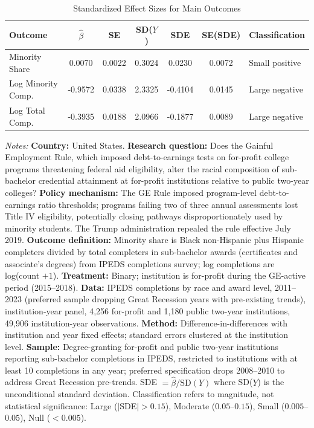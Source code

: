 \begin{table}[H]
\centering
\caption{Standardized Effect Sizes for Main Outcomes}
\label{tab:sde}
\begin{threeparttable}
\begin{tabular}{lcccccl}
\toprule
Outcome & $\hat{\beta}$ & SE & SD($Y$) & SDE & SE(SDE) & Classification \\
\midrule
Minority Share & 0.0070 & 0.0022 & 0.3024 & 0.0230 & 0.0072 & Small positive \\
Log Minority Comp. & -0.9572 & 0.0338 & 2.3325 & -0.4104 & 0.0145 & Large negative \\
Log Total Comp. & -0.3935 & 0.0188 & 2.0966 & -0.1877 & 0.0089 & Large negative \\
\bottomrule
\end{tabular}
\begin{tablenotes}[flushleft]
\small
\item \textit{Notes:} \textbf{Country:} United States. \textbf{Research question:} Does the Gainful Employment Rule, which imposed debt-to-earnings tests on for-profit college programs threatening federal aid eligibility, alter the racial composition of sub-bachelor credential attainment at for-profit institutions relative to public two-year colleges? \textbf{Policy mechanism:} The GE Rule imposed program-level debt-to-earnings ratio thresholds; programs failing two of three annual assessments lost Title IV eligibility, potentially closing pathways disproportionately used by minority students. The Trump administration repealed the rule effective July 2019. \textbf{Outcome definition:} Minority share is Black non-Hispanic plus Hispanic completers divided by total completers in sub-bachelor awards (certificates and associate's degrees) from IPEDS completions survey; log completions are log(count $+ 1$). \textbf{Treatment:} Binary; institution is for-profit during the GE-active period (2015--2018). \textbf{Data:} IPEDS completions by race and award level, 2011--2023 (preferred sample dropping Great Recession years with pre-existing trends), institution-year panel, 4,256 for-profit and 1,180 public two-year institutions, 49,906 institution-year observations. \textbf{Method:} Difference-in-differences with institution and year fixed effects; standard errors clustered at the institution level. \textbf{Sample:} Degree-granting for-profit and public two-year institutions reporting sub-bachelor completions in IPEDS, restricted to institutions with at least 10 completions in any year; preferred specification drops 2008--2010 to address Great Recession pre-trends. SDE $= \hat{\beta} / \text{SD}(Y)$ where SD($Y$) is the unconditional standard deviation. Classification refers to magnitude, not statistical significance: Large ($|$SDE$| > 0.15$), Moderate ($0.05$--$0.15$), Small ($0.005$--$0.05$), Null ($< 0.005$). 
\end{tablenotes}
\end{threeparttable}
\end{table}
